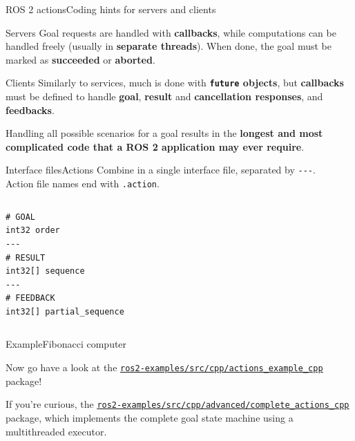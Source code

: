 \begin{frame}{ROS 2 actions}{Coding hints for servers and clients}
  \begin{block}{Servers}
    Goal requests are handled with \textbf{callbacks}, while computations can be handled freely (usually in \textbf{separate threads}). When done, the goal must be marked as \textbf{succeeded} or \textbf{aborted}.
  \end{block}
  \begin{block}{Clients}
    Similarly to services, much is done with \textbf{\texttt{future} objects}, but \textbf{callbacks} must be defined to handle \textbf{goal}, \textbf{result} and \textbf{cancellation responses}, and \textbf{feedbacks}.
  \end{block}
  \begin{block}{}
    \centering
    Handling all possible scenarios for a goal results in the \textbf{longest and most complicated code that a ROS 2 application may ever require}. {\Large\smiley{}}
  \end{block}
\end{frame}

\begin{frame}[fragile]{Interface files}{Actions}
  Combine  in a single interface file, separated by \texttt{-{}-{}-}.\\
  Action file names end with \texttt{.action}.
  \begin{columns}
  \begin{lstlisting}[language=ros2msg, caption=Definition of the \texttt{ros2\_examples\_interfaces/action/Fibonacci} action.]
# GOAL
int32 order
---
# RESULT
int32[] sequence
---
# FEEDBACK
int32[] partial_sequence\end{lstlisting}
  \end{columns}
\end{frame}

\begin{frame}{Example}{Fibonacci computer}
  \begin{block}{}
    \centering
    Now go have a look at the \href{https://github.com/IntelligentSystemsLabUTV/ros2-examples/tree/humble/src/cpp/actions_example_cpp}{\color{blue}\underline{\texttt{ros2-examples/src/cpp/actions\_example\_cpp}}} package!
  \end{block}
  If you're curious, the \href{https://github.com/IntelligentSystemsLabUTV/ros2-examples/tree/humble/src/cpp/advanced/complete_actions_cpp}{\color{blue}\underline{\texttt{ros2-examples/src/cpp/advanced/complete\_actions\_cpp}}} package, which implements the complete goal state machine using a multithreaded executor.
\end{frame}
